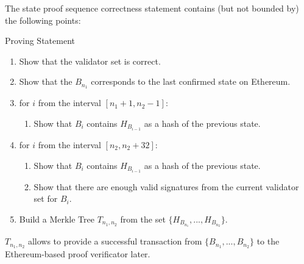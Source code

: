 The state proof sequence correctness statement contains (but not bounded by) the following points:
\begin{algorithm}
    \caption{Proving Statement}
    \label{circuit}
    \begin{enumerate}
        \item Show that the validator set is correct.
        \item Show that the $B_{n_1}$ corresponds to the last confirmed state on Ethereum.
        \item for $i$ from the interval $[n_1 + 1, n_2 - 1]$:
        \begin{enumerate}
            \item Show that $B_{i}$ contains $H_{B_{i - 1}}$ as a hash of the previous state.
        \end{enumerate}
        \item for $i$ from the interval $[n_2, n_2 + 32]$:
        \begin{enumerate}
            \item Show that $B_{i}$ contains $H_{B_{i - 1}}$ as a hash of the previous state.
            \item Show that there are enough valid signatures from the current validator set for $B_{i}$.
        \end{enumerate}
        \item Build a Merkle Tree $T_{n_1, n_2}$ from the set $\{H_{B_{n_1}}, ..., H_{B_{n_2}}\}$.
    \end{enumerate}
\end{algorithm}

$T_{n_1, n_2}$ allows to provide a successful transaction from $\{B_{n_1}, ..., B_{n_2}\}$ to the Ethereum-based proof verificator later.
